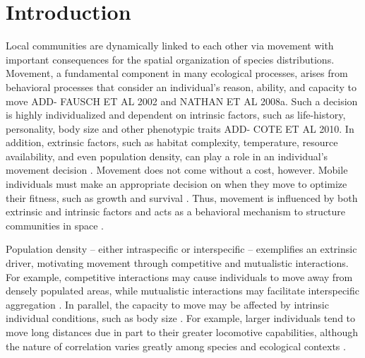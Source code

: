 \documentclass[11pt, class=article, crop=false]{standalone}
\begin{document}
\newpage

\section{Introduction}

Local communities are dynamically linked to each other via movement with important consequences for the spatial organization of species distributions. Movement, a fundamental component in many ecological processes, arises from behavioral processes that consider an individual's reason, ability, and capacity to move \citep{clobertDispersalEcologyEvolution2012, fausch} ADD- FAUSCH ET AL 2002 and NATHAN ET AL 2008a. Such a decision is highly individualized and dependent on intrinsic factors, such as life-history, personality, body size and other phenotypic traits \citep{fraserExplainingLeptokurticMovement2001} ADD- COTE ET AL 2010. In addition, extrinsic factors, such as habitat complexity, temperature, resource availability, and even population density, can play a role in an individual's movement decision \citep{bonteCostsDispersal2012, bowlerCausesConsequencesAnimal2005, rasmussenIndividualMovementStream2017}. Movement does not come without a cost, however. Mobile individuals must make an appropriate decision on when they move to optimize their fitness, such as growth and survival \citep{bonteCostsDispersal2012}. Thus, movement is influenced by both extrinsic and intrinsic factors and acts as a behavioral mechanism to structure communities in space \citep{leiboldMetacommunityConceptFramework2004, mcpeekEvolutionPassiveDispersal2024, schlagelMovementmediatedCommunityAssembly2020}. 

Population density – either intraspecific or interspecific – exemplifies an extrinsic driver, motivating movement through competitive and mutualistic interactions. For example, competitive interactions may cause individuals to move away from densely populated areas, while mutualistic interactions may facilitate interspecific aggregation \citep{thierryInterplayAbioticBiotic2024, rasmussenIndividualMovementStream2017}. In parallel, the capacity to move may be affected by intrinsic individual conditions, such as body size \citep{clobertDispersalEcologyEvolution2012}. For example,  larger individuals tend to move long distances due in part to their greater locomotive capabilities, although the nature of correlation varies greatly among species and ecological contexts \citep{comteEvidenceDispersalSyndromes2018, teruiParasiteInfectionInduces2017, radingerPatternsPredictorsFish2014, debeffeConditiondependentNatalDispersal2012,gilliamMovementCorridorsEnhancement2001}.
\end{document}
